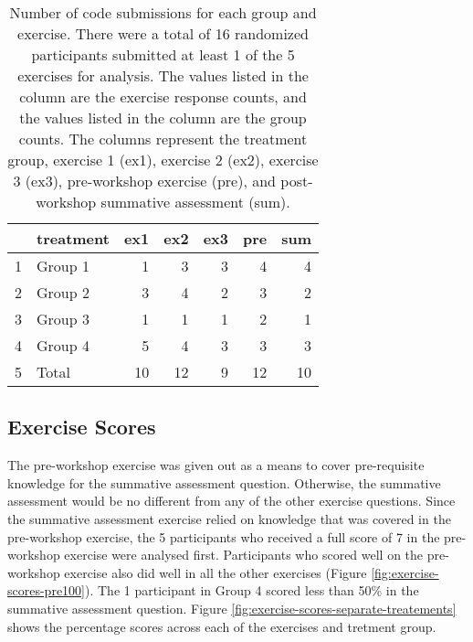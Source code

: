 \documentclass[040-assessment.tex]{subfiles}
\begin{document}
    \begin{table}[ht]
        \centering
        \caption[Number of responses by group and exercise]
        {Number of code submissions for each group and exercise.
         There were a total of 16 randomized participants submitted at least 1 of the 5 exercises for analysis.
         The values listed in the  column are the exercise response counts,
         and the values listed in the  column are the group counts.
         The columns represent the
         treatment group,
         exercise 1 (ex1), exercise 2 (ex2), exercise 3 (ex3),
         pre-workshop exercise (pre), and
         post-workshop summative assessment (sum).
        }
        \begin{tabular}{rlrrrrr}
            \hline
           & treatment & ex1 & ex2 & ex3 & pre & sum \\
            \hline
            1 & Group 1 &   1 &   3 &   3 &   4 &   4 \\
            2 & Group 2 &   3 &   4 &   2 &   3 &   2 \\
            3 & Group 3 &   1 &   1 &   1 &   2 &   1 \\
            4 & Group 4 &   5 &   4 &   3 &   3 &   3 \\
            5 & Total &  10 &  12 &   9 &  12 &  10 \\
             \hline
          \end{tabular}
          \label{tab:exercise-treatment-response-counts}
    \end{table}

\subsection{Exercise Scores}

    The pre-workshop exercise was given out as a means to cover pre-requisite knowledge for the
    summative assessment question.
    Otherwise, the summative assessment would be no different from any of the other exercise
    questions.
    Since the summative assessment exercise relied on knowledge that was covered in the
    pre-workshop exercise,
    the 5 participants who received a full score of 7 in the pre-workshop exercise were analysed first.
    Participants who scored well on the pre-workshop exercise also did well in all the other exercises
    (Figure \ref{fig:exercise-scores-pre100}).
    The 1 participant in Group 4 scored less than 50\% in the summative assessment question.
    Figure \ref{fig:exercise-scores-separate-treatements} shows the percentage scores across each
    of the exercises and tretment group.
\end{document}
